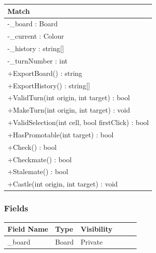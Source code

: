 \documentclass[12pt]{article}
\begin{document}
    \begin{table}[H]
        \begin{tabular}{|l|}
            \hline
            \rowcolor[HTML]{C0C0C0}
            \textbf{Match}                                    \\ \hline
            \rowcolor[HTML]{EFEFEF}
            -\_board : Board                                  \\ \hline
            \rowcolor[HTML]{EFEFEF}
            -\_current : Colour                               \\ \hline
            \rowcolor[HTML]{EFEFEF}
            -\_history : string{[}{]}                         \\ \hline
            \rowcolor[HTML]{EFEFEF}
            -\_turnNumber : int                               \\ \hline
            +ExportBoard() : string                           \\ \hline
            +ExportHistory() : string[]                       \\ \hline
            +ValidTurn(int origin, int target) : bool         \\ \hline
            +MakeTurn(int origin, int target) : void          \\ \hline
            +ValidSelection(int cell, bool firstClick) : bool \\ \hline
            +HasPromotable(int target) : bool                 \\ \hline
            +Check() : bool                                   \\ \hline
            +Checkmate() : bool                               \\ \hline
            +Stalemate() : bool                               \\ \hline
            +Castle(int origin, int target) : void            \\ \hline
        \end{tabular}
    \end{table}

    \subsubsection{Fields}

    \begin{table}[H]
        \begin{tabular}{llllll}
            \hline
            \multicolumn{1}{|l|}{\cellcolor[HTML]{EFEFEF}\textbf{Field Name}} & \multicolumn{1}{l|}{\cellcolor[HTML]{EFEFEF}\textbf{Type}} & \multicolumn{1}{l|}{\cellcolor[HTML]{EFEFEF}\textbf{Visibility}} \\ \hline
            \multicolumn{1}{|l|}{\_board}                                     & \multicolumn{1}{l|}{Board}                                 & \multicolumn{1}{l|}{Private}                                     \\ \hline
        \end{tabular}
    \end{table}
\end{document}
